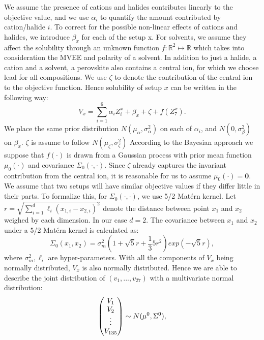 \documentclass[11pt]{article}
\begin{document}
We assume the presence of cations and halides contributes linearly to the objective value, and we use $\alpha_i$ to quantify the amount contributed by cation/halide $i$. To correct for the possible non-linear effects of cations and halides, we introduce $\beta_x$ for each of the setup x. For solvents, we assume they affect the solubility through an unknown function $f:\mathbb{R}^{2}\mapsto \mathbb{R}$ which takes into consideration the MVEE and polarity of a solvent. In addition to just a halide, a cation and a solvent, a perovskite also contains a central ion, for which we choose lead for all compositions. We use $\zeta$ to denote the contribution of the central ion to the objective function. Hence solubility of setup $x$ can be written in the following way:
\begin{equation}
V_x = \sum_{i=1}^{6}\alpha_i Z_i^x + \beta_x + \zeta + f(Z_7^x).
\end{equation}
We place the same prior distribution $N(\mu_{\alpha},\sigma^2_{\alpha})$ on each of $\alpha_i$, and $N(0, \sigma^2_{\beta})$ on $\beta_x$. $\zeta$ is assume to follow $N(\mu_{\zeta}, \sigma^2_{\zeta})$ According to the  Bayesian approach we suppose that $f(\cdot)$ is drawn from a Gaussian process with prior mean function $\mu_0(\cdot)$ and covariance $\Sigma_0(\cdot,\cdot)$. Since $\zeta$ already captures the invariant contribution from the central ion, it is reasonable for us to assume $\mu_0(\cdot)=\mathbf{0}$. We assume that two setups will have similar objective values if they differ little in their parts. To formalize this, for $\Sigma_0(\cdot,\cdot)$, we use 5/2 Mat\'ern kernel. Let $r = \sqrt{\sum_{i=1}^{d}\ell_i(x_{1,i}-x_{2,i})^2}$ denote the distance between point $x_1$ and $x_2$ weighed by each dimension. In our case $d = 2$. The covariance between $x_1$ and $x_2$ under a 5/2 Mat\'ern kernel is calculated as:
\begin{equation}
\Sigma_0(x_1,x_2) =  \sigma_m^2\left(1+\sqrt{5}r+\frac{1}{3}5r^2
\right)exp\left(-\sqrt{5}r\right),
\end{equation}
where $\sigma^2_m, \ell_i$ are hyper-parameters. With all the components of $V_x$ being normally distributed, $V_x$ is also normally distributed. Hence we are able to describe the joint distribution of $(v_1,...,v_{27})$ with a multivariate normal distribution:
\begin{equation}\label{prior}
\begin{pmatrix}
V_1 \\ V_2 \\ \vdots \\ V_{135}
\end{pmatrix} \sim N\Large(\mu^0, \Sigma^0\Large),
\end{equation}
\end{document}
